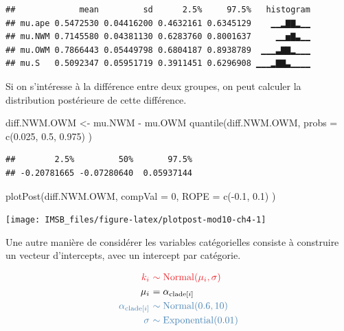 \documentclass[
  a4paper,11pt,twoside,onecolumn,openright,final,oldfontcommands]{memoir}
\newenvironment{Shaded}{\begin{snugshade}}{\end{snugshade}}
\newcommand{\AttributeTok}[1]{\textcolor[rgb]{0.77,0.63,0.00}{#1}}
\newcommand{\DecValTok}[1]{\textcolor[rgb]{0.00,0.00,0.81}{#1}}
\newcommand{\FloatTok}[1]{\textcolor[rgb]{0.00,0.00,0.81}{#1}}
\newcommand{\FunctionTok}[1]{\textcolor[rgb]{0.00,0.00,0.00}{#1}}
\newcommand{\NormalTok}[1]{#1}
\newcommand{\OtherTok}[1]{\textcolor[rgb]{0.56,0.35,0.01}{#1}}
\newcommand{\SpecialCharTok}[1]{\textcolor[rgb]{0.00,0.00,0.00}{#1}}
\theoremstyle{definition}
\theoremstyle{definition}
\theoremstyle{definition}
\theoremstyle{definition}
\theoremstyle{remark}
\begin{document}
\begin{verbatim}
##             mean         sd      2.5%     97.5%   histogram
## mu.ape 0.5472530 0.04416200 0.4632161 0.6345129    ▁▁▂▇▇▂▁▁
## mu.NWM 0.7145580 0.04381130 0.6283760 0.8001637     ▁▁▅▇▃▁▁
## mu.OWM 0.7866443 0.05449798 0.6804187 0.8938789  ▁▁▁▃▇▇▂▁▁▁
## mu.S   0.5092347 0.05951719 0.3911451 0.6296908 ▁▁▁▂▇▇▃▁▁▁▁
\end{verbatim}

Si on s'intéresse à la différence entre deux groupes, on peut calculer la distribution postérieure de cette différence.

\begin{Shaded}
\begin{Highlighting}[]
\NormalTok{diff.NWM.OWM }\OtherTok{\textless{}{-}}\NormalTok{ mu.NWM }\SpecialCharTok{{-}}\NormalTok{ mu.OWM}
\FunctionTok{quantile}\NormalTok{(diff.NWM.OWM, }\AttributeTok{probs =} \FunctionTok{c}\NormalTok{(}\FloatTok{0.025}\NormalTok{, }\FloatTok{0.5}\NormalTok{, }\FloatTok{0.975}\NormalTok{) )}
\end{Highlighting}
\end{Shaded}

\begin{verbatim}
##        2.5%         50%       97.5% 
## -0.20781665 -0.07280640  0.05937144
\end{verbatim}

\begin{Shaded}
\begin{Highlighting}[]
\FunctionTok{plotPost}\NormalTok{(diff.NWM.OWM, }\AttributeTok{compVal =} \DecValTok{0}\NormalTok{, }\AttributeTok{ROPE =} \FunctionTok{c}\NormalTok{(}\SpecialCharTok{{-}}\FloatTok{0.1}\NormalTok{, }\FloatTok{0.1}\NormalTok{) )}
\end{Highlighting}
\end{Shaded}

\begin{center}\texttt{[image: IMSB\_files/figure-latex/plotpost-mod10-ch4-1]} \end{center}

Une autre manière de considérer les variables catégorielles consiste à construire un vecteur d'intercepts, avec un intercept par catégorie.

\[
\begin{aligned}
\color{orangered}{k_{i}} \ &\color{orangered}{\sim \mathrm{Normal}(\mu_{i}, \sigma)} \\
\color{black}{\mu_{i}} \ &\color{black}{= \alpha_{\text{clade}[i]}} \\
\color{steelblue}{\alpha_{\text{clade}[i]}} \ &\color{steelblue}{\sim \mathrm{Normal}(0.6, 10)} \\
\color{steelblue}{\sigma} \ &\color{steelblue}{\sim \mathrm{Exponential}(0.01)}
\end{aligned}
\]
\end{document}
